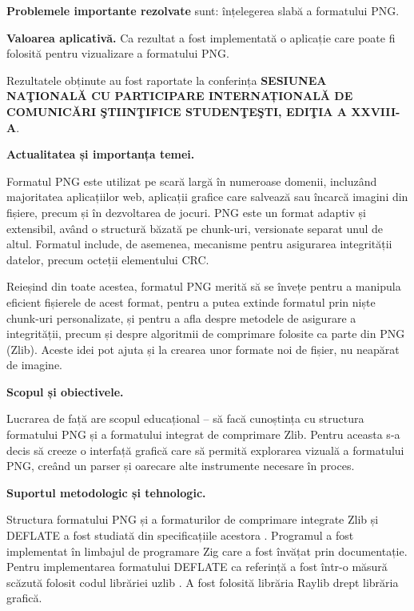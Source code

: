 \documentclass[a4paper,12pt]{report}
\newcommand{\conferencesList}{SESIUNEA NAŢIONALĂ CU PARTICIPARE INTERNAȚIONALĂ DE COMUNICĂRI ŞTIINŢIFICE STUDENŢEŞTI, EDIŢIA A XXVIII-A}
\begin{document}
\textbf{Problemele importante rezolvate} sunt: înțelegerea slabă a formatului \ac{PNG}.

\textbf{Valoarea aplicativă.} Ca rezultat a fost implementată o aplicație care poate fi folosită pentru vizualizare a formatului \ac{PNG}.

Rezultatele obținute au fost raportate la conferința \textbf{\conferencesList}.



\textbf{Actualitatea și importanța temei.}

Formatul \ac{PNG} este utilizat pe scară largă în numeroase domenii, incluzând majoritatea aplicațiilor
web, aplicații grafice care salvează sau încarcă imagini din fișiere, precum și în dezvoltarea de jocuri.
\ac{PNG} este un format adaptiv și extensibil, având o structură băzată pe chunk-uri, versionate separat unul
de altul. Formatul include, de asemenea, mecanisme pentru asigurarea integrității datelor, precum
octeții elementului \ac{CRC}.

Reieșind din toate acestea, formatul \ac{PNG} merită să se învețe pentru a manipula eficient fișierele de
acest format, pentru a putea extinde formatul prin niște chunk-uri personalizate, și pentru a afla despre
metodele de asigurare a integrității, precum și despre algoritmii de comprimare folosite ca parte din \ac{PNG}
(Zlib). Aceste idei pot ajuta și la crearea unor formate noi de fișier, nu neapărat de imagine.

\textbf{Scopul și obiectivele.}

Lucrarea de față are scopul educațional -- să facă cunoștința cu structura formatului \ac{PNG} și a
formatului integrat de comprimare \ac{Zlib}.
Pentru aceasta s-a decis să creeze o interfață grafică care
să permită explorarea vizuală a formatului \ac{PNG},
creând un parser și oarecare alte instrumente necesare în proces.


\textbf{Suportul metodologic și tehnologic.}

Structura formatului \ac{PNG} și a formaturilor de comprimare integrate Zlib și DEFLATE
a fost studiată din specificațiile acestora \cite{png_spec} \cite{zlib_spec} \cite{deflate_spec}.
Programul a fost implementat în limbajul de programare Zig \cite{zig} care a fost învățat prin documentație.
Pentru implementarea formatului DEFLATE ca referință a fost într-o măsură scăzută folosit codul librăriei uzlib \cite{gzip_impl}.
A fost folosită librăria Raylib \cite{raylib} drept librăria grafică.
\end{document}
